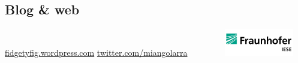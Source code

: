 \begin{aside}
\section{Blog \& web}
    \href{https://fidgetyfig.wordpress.com}{fidgetyfig.wordpress.com}
    \href{https://twitter.com/miangolarra}{twitter.com/miangolarra}
    ~
    \vspace{1cm}
    ~
    ~
    ~
    ~
    \includegraphics[width=3cm]{img/logo_iese}
\end{aside}

